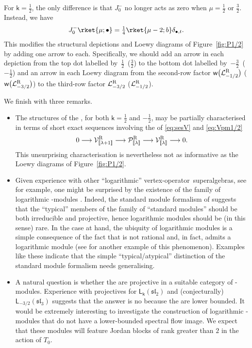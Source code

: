 \documentclass[pdftex]{sigma}
\numberwithin{equation}{section}
\newcommand{\kk}{\mathsf{k}} %
\newcommand{\R}{\textnormal{R}}
\DeclarePairedDelimiter{\brac}{\lparen}{\rparen} %
\DeclarePairedDelimiter{\dbrac}{\llbracket}{\rrbracket} %
\newcommand{\lra}{\longrightarrow}
\newcommand{\ses}[3]{0 \lra #1 \lra #2 \lra #3 \lra 0}
\newcommand{\fld}[1]{\mathbb{#1}} %
\newcommand{\alg}[1]{\mathfrak{#1}} %
\newcommand{\VOA}[1]{\mathsf{#1}} %
\newcommand{\Mod}[1]{\mathcal{#1}} %
\newcommand{\ZZ}{\fld{Z}}
\newcommand{\CC}{\fld{C}}
\newcommand{\SLA}[2]{\alg{#1}_{#2}} %
\newcommand{\sltwo}{\SLA{sl}{2}}
\newcommand{\slthree}{\SLA{sl}{3}}
\newcommand{\saff}[2]{\VOA{L}_{#1}(#2)} %
\newcommand{\ssl}[1][\kk]{\saff{#1}{\sltwo}} %
\newcommand{\swalg}[2]{\VOA{W}_{#1}^{\mathrm{#2}}} %
\newcommand{\spr}[1][\kk]{\swalg{#1}{pr}} %
\newcommand{\smin}[1][\kk]{\swalg{#1}{min}} %
\newcommand{\sminpmhalf}{\smin[\pm 1/2]}
\newcommand{\nconjsymb}{\mathsf{w}} %
\newcommand{\nconj}{\nconjsymb \brac}
\newcommand{\nrihw}[1]{\Mod{L}^{\R}_{#1}}
\newcommand{\nrver}[1]{\Mod{V}^{\R}_{\vphantom{[#1]}\smash{\dbrac{#1}}}}
\newcommand{\nrsublog}[1]{\Mod{P}^{\R}_{\vphantom{[#1]}\smash{\dbrac{#1}}}}
\newcommand{\vo}{vertex-operator}
\newcommand{\svoa}{\vo\ superalgebra}
\newcommand{\svoas}{\svoa s}
\begin{document}
For $\kk=\frac{1}{2}$, the only difference is that $J^-_0$ no longer acts as zero when $\mu=\frac{1}{2}$ or $\frac{3}{2}$.
Instead, we have
\[
	J^-_0 \rket{\mu;\bullet} = \tfrac{1}{4} \rket{\mu-2;b} \delta_{\bullet,t}.
\]
This modifies the structural depictions and Loewy diagrams of Figure~\ref{fig:P1/2} by adding one arrow to each.
Specifically, we should add an arrow in each depiction from the top dot labelled by~$\frac{1}{2}$~\big($\frac{3}{2}$\big) to the bottom dot labelled by~$-\frac{3}{2}$~\big($-\frac{1}{2}$\big) and an arrow in each Loewy diagram from the second-row factor $\nconj[\big]{\nrihw{-1/2}}$ \big($\nconj[\big]{\nrihw{-3/2}}$\big) to the third-row factor $\nrihw{-3/2}$ \big($\nrihw{-1/2}$\big).

We finish with three remarks.
\begin{itemize}\itemsep=0pt
	\item The structures of the \smash{$\nrsublog{\lambda}$}, for both $\kk=\frac{1}{2}$ and $-\frac{1}{2}$, may be partially characterised in terms of short exact sequences involving the \smash{$\nrver{\lambda}$} of \eqref{eq:sesV} and \eqref{eq:Vpm1/2}
	\[
		\ses{\nrver{\lambda+1}}{\nrsublog{\lambda}}{\nrver{\lambda}}.
	\]
	This unsurprising characterisation is nevertheless not as informative as the Loewy diagrams of Figure~\ref{fig:P1/2}.
	\item Given experience with other ``logarithmic'' \svoas, see \cite{CreLog13} for example, one might be surprised by the existence of the family of logarithmic \smash{$\sminpmhalf$}-modules \smash{$\bigl\{\nrsublog{\lambda} \mid \dbrac{\lambda} \in \CC/2\ZZ\bigr\}$}.
	Indeed, the standard module formalism of \cite{CreLog13,RidVer14} suggests that the ``typical'' members of the family of ``standard modules'' should be both irreducible and projective, hence logarithmic modules should be (in this sense) rare.
	In the case at hand, the ubiquity of logarithmic modules is a simple consequence of the fact that \smash{$\spr[\pm1/2]$} is not rational and, in fact, admits a logarithmic module (see \cite[Section~4.2]{AdaWei23} for another example of this phenomenon).
	Examples like these indicate that the simple ``typical/atypical'' distinction of the standard module formalism needs generalising.
	\item A natural question is whether the \smash{$\nrsublog{\lambda}$} are projective in a suitable category of \smash{$\sminpmhalf$}-modules.
	Experience with projectives for $\ssl$ \cite{AraWei23,CreCos18} and (conjecturally) $\saff{-3/2}{\slthree}$ \cite{CreKaz21} suggests that the answer is no because the \smash{$\nrsublog{\lambda}$} are lower bounded.
	It would be extremely interesting to investigate the construction of logarithmic \smash{$\sminpmhalf$}-modules that do not have a lower-bounded spectral flow image.
	We expect that these modules will feature Jordan blocks of rank greater than $2$ in the action of $T_0$.
\end{itemize}
\end{document}

